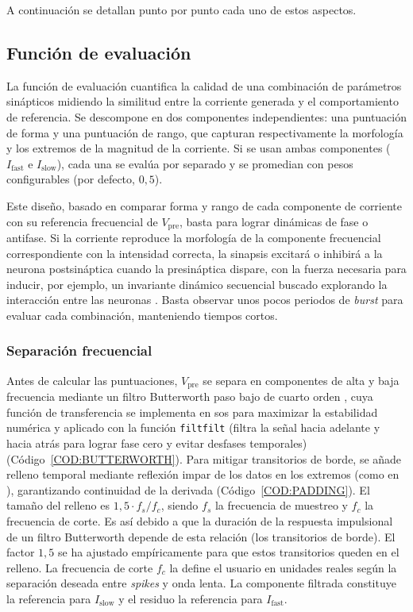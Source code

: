 A continuación se detallan punto por punto cada uno de estos aspectos.


\subsection{Función de evaluación\label{SUBSEC:FUNCION_EVALUACION}}

La función de evaluación cuantifica la calidad de una combinación de parámetros sinápticos midiendo la similitud entre la corriente generada y el comportamiento de referencia. Se descompone en dos componentes independientes: una puntuación de forma y una puntuación de rango, que capturan respectivamente la morfología y los extremos de la magnitud de la corriente. Si se usan ambas componentes (\(I_{\mathrm{fast}}\) e \(I_{\mathrm{slow}}\)), cada una se evalúa por separado y se promedian con pesos configurables (por defecto, $0{,}5$).

Este diseño, basado en comparar forma y rango de cada componente de corriente con su referencia frecuencial de $V_{\mathrm{pre}}$, basta para lograr dinámicas de fase o antifase. Si la corriente reproduce la morfología de la componente frecuencial correspondiente con la intensidad correcta, la sinapsis excitará o inhibirá a la neurona postsináptica cuando la presináptica dispare, con la fuerza necesaria para inducir, por ejemplo, un invariante dinámico secuencial buscado explorando la interacción entre las neuronas \cite{Elices2019}. Basta observar unos pocos periodos de \textit{burst} para evaluar cada combinación, manteniendo tiempos cortos.

\subsubsection{Separación frecuencial}

Antes de calcular las puntuaciones, \(V_{\mathrm{pre}}\) se separa en componentes de alta y baja frecuencia mediante un filtro Butterworth paso bajo de cuarto orden \cite{Butterworth1930}, cuya función de transferencia se implementa en \ac{sos} para maximizar la estabilidad numérica \cite{Proakis2007} y aplicado con la función \texttt{filtfilt} (filtra la señal hacia adelante y hacia atrás para lograr fase cero y evitar desfases temporales) \cite{Gustafsson1996} (Código~\ref{COD:BUTTERWORTH}). Para mitigar transitorios de borde, se añade relleno temporal mediante reflexión impar de los datos en los extremos (como en \cite{SciPyfiltfilt}), garantizando continuidad de la derivada (Código~\ref{COD:PADDING}). El tamaño del relleno es $1{,}5 \cdot f_s/f_c$, siendo $f_s$ la frecuencia de muestreo y $f_c$ la frecuencia de corte. Es así debido a que la duración de la respuesta impulsional de un filtro Butterworth depende de esta relación (los transitorios de borde). El factor $1{,}5$ se ha ajustado empíricamente para que estos transitorios queden en el relleno. La frecuencia de corte \(f_c\) la define el usuario en unidades reales según la separación deseada entre \textit{spikes} y onda lenta. La componente filtrada constituye la referencia para \(I_{\mathrm{slow}}\) y el residuo la referencia para \(I_{\mathrm{fast}}\).

